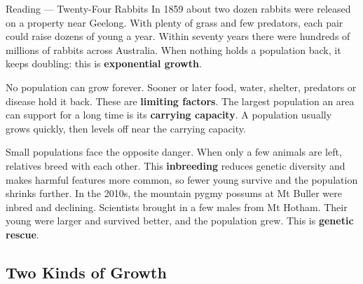 \begin{readingbox}{Reading --- Twenty-Four Rabbits}
In 1859 about two dozen rabbits were released on a property near Geelong. With plenty of grass and few predators, each pair could raise dozens of young a year. Within seventy years there were hundreds of millions of rabbits across Australia. When nothing holds a population back, it keeps doubling: this is \textbf{exponential growth}.

No population can grow forever. Sooner or later food, water, shelter, predators or disease hold it back. These are \textbf{limiting factors}. The largest population an area can support for a long time is its \textbf{carrying capacity}. A population usually grows quickly, then levels off near the carrying capacity.

Small populations face the opposite danger. When only a few animals are left, relatives breed with each other. This \textbf{inbreeding} reduces genetic diversity and makes harmful features more common, so fewer young survive and the population shrinks further. In the 2010s, the mountain pygmy possums at Mt Buller were inbred and declining. Scientists brought in a few males from Mt Hotham. Their young were larger and survived better, and the population grew. This is \textbf{genetic rescue}.
\end{readingbox}

\rcreset
{}

\label{theory:7}

\subsection{Two Kinds of Growth}\label{sub:a7.1}

\begin{center}
\end{center}

